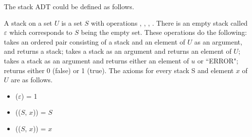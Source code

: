 The stack ADT could be defined as follows.

A stack on a set $U$ is a set $S$ with operations ,
, , . There is an empty
stack called $\varepsilon$ which corresponds to $S$ being the empty
set. These operations do the following:  takes an ordered
pair consisting of a stack and an element of $U$ as an argument, and
returns a stack;  takes a stack as an argument and returns
an element of $U$;  takes a stack as an argument and returns
either an element of $u$ or ``ERROR";  returns either
0 (false) or 1 (true). The axioms for every stack S and element $x$ of $U$ are 
as follows.
\begin{itemize}
\item {}($\varepsilon$) = 1
\item {}(($S$, $x$)) = $S$
\item {}(($S$, $x$)) = $x$
\end{itemize}

